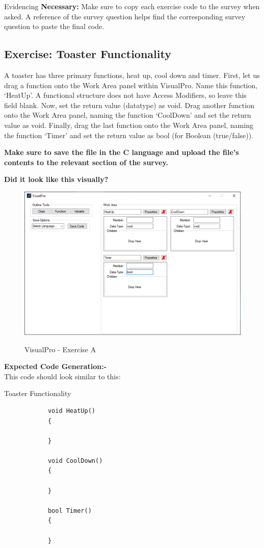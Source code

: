 \documentclass[10pt]{article}
\begin{document}
      \begin{tip}{Evidencing}
        \textbf{Necessary:} Make sure to copy each exercise code to the survey when asked. A reference of the survey question helps find the corresponding survey question to paste the final code.
      \end{tip}

    \subsection{Exercise: Toaster Functionality}
      A toaster has three primary functions, heat up, cool down and timer. First, let us drag a function onto the Work Area panel within VisualPro. Name this function, `HeatUp'. A functional structure does not have Access Modifiers, so leave this field blank. Now, set the return value (datatype) as void. Drag another function onto the Work Area panel, naming the function `CoolDown' and set the return value as void. Finally, drag the last function onto the Work Area panel, naming the function `Timer' and set the return value as bool (for Boolean (true/false)).

      \textbf{Make sure to save the file in the C language and upload the file's contents to the relevant section of the survey.} 

      \textbf{Did it look like this visually?}
        \begin{figure}[h]
          \centering
          {\includegraphics[scale=0.75]{Figures/Exercises/TutB-SecA-1.png}}
          \caption{VisualPro - Exercise A}
          \label{fig:vp-eA}
        \end{figure}

      \textbf{Expected Code Generation:-}\\
        This code should look similar to this:
        \begin{example}{Toaster Functionality}
          \begin{lstlisting}
            void HeatUp()
            {

            }

            void CoolDown()
            {

            }

            bool Timer()
            {

            }
          \end{lstlisting}
        \end{example}
\end{document}
